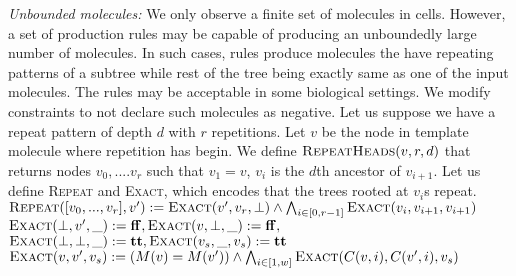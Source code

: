 {\em Unbounded molecules: }
We only observe a finite set of molecules in cells.
However, a set of production rules may be capable of producing an unboundedly large number of molecules.
In such cases, rules produce molecules the have repeating patterns of a subtree while rest of the tree being exactly same as one of the input molecules. The rules may be acceptable in some biological settings. We modify constraints to not declare such molecules as negative.
Let us suppose we have a repeat pattern of depth $d$ with $r$ repetitions.
Let $v$ be the node in template molecule where repetition has begin.
We define $\textsc{RepeatHeads}(v,r,d)$ that returns nodes $v_0,.... v_r$ such that
$v_1 = v$, $v_i$ is the $d$th ancestor of $v_{i+1}$.
Let us define \textsc{Repeat} and \textsc{Exact}, which encodes that the trees rooted at $v_{i}$s repeat.\\
$\textsc{Repeat}([v_0,...,v_r], v') :=  \textsc{Exact}(v',v_r,\bot) \land \bigwedge_{i\in[0,r-1]} \textsc{Exact}( v_i, v_{i+1},v_{i+1})$\\
$\textsc{Exact}(\bot,v',\_) := \mathbf{ff}, \textsc{Exact}(v,\bot,\_) := \mathbf{ff},$\\
$ \textsc{Exact}(\bot,\bot,\_) := \mathbf{tt},\textsc{Exact}(v_s,\_,v_s) := \mathbf{tt}$\\
$\textsc{Exact}(v,v',v_s) := (M(v) = M(v')) \land \bigwedge_{i \in [1,w]} \textsc{Exact}(C(v,i),C(v',i),v_s)$\\
